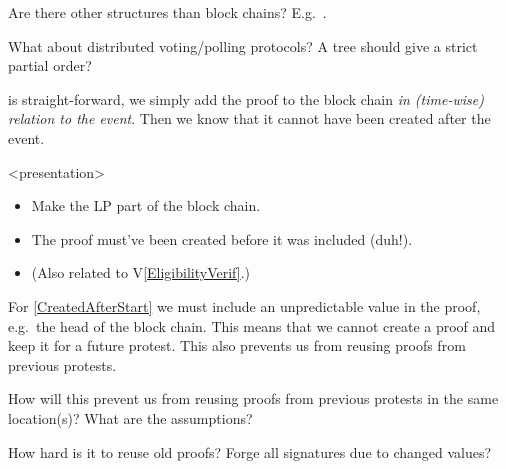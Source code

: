 \begin{frame}
  \begin{question}
    Are there other structures than block chains?
    E.g.~\cite{BlockchainFreeCryptocurrencies}.
  \end{question}
  \begin{question}
    What about distributed voting/polling protocols?
    A tree should give a strict partial order?
  \end{question}
\end{frame}

 is straight-forward, we simply add the proof to the 
block chain \emph{in (time-wise) relation to the event}.
Then we know that it cannot have been created after the event.

\begin{frame}<presentation>
  \begin{solution}
    \begin{itemize}
      \item Make the \ac{LP} part of the block chain.
      \item The proof must've been created before it was included (duh!).
      \item (Also related to V\ref{EligibilityVerif}.)
    \end{itemize}
  \end{solution}
\end{frame}

For \cref{CreatedAfterStart} we must include an unpredictable value in the 
proof, e.g.\ the head of the block chain.
This means that we cannot create a proof and keep it for a future protest.
This also prevents us from reusing proofs from previous protests.

\begin{frame}

  \pause

  \begin{question}
    How will this prevent us from reusing proofs from previous protests in 
    the same location(s)?
    What are the assumptions?
  \end{question}
  \begin{question}
    How hard is it to reuse old proofs?
    Forge all signatures due to changed values?
  \end{question}
\end{frame}

